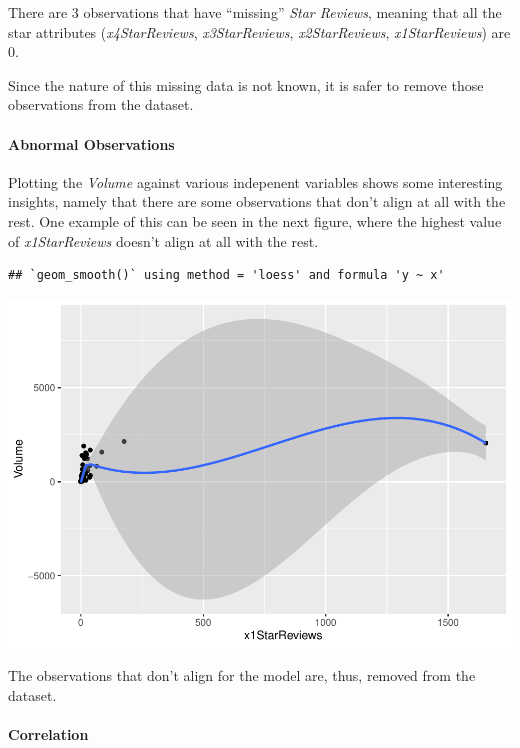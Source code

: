 \documentclass[]{article}
\let\oldparagraph\paragraph
\renewcommand{\paragraph}[1]{\oldparagraph{#1}\mbox{}}
\begin{document}
There are 3 observations that have ``missing'' \emph{Star Reviews},
meaning that all the star attributes (\emph{x4StarReviews},
\emph{x3StarReviews}, \emph{x2StarReviews}, \emph{x1StarReviews}) are 0.

Since the nature of this missing data is not known, it is safer to
remove those observations from the dataset.

\hypertarget{abnormal-observations}{%
\paragraph{Abnormal Observations}\label{abnormal-observations}}

Plotting the \emph{Volume} against various indepenent variables shows
some interesting insights, namely that there are some observations that
don't align at all with the rest. One example of this can be seen in the
next figure, where the highest value of \emph{x1StarReviews} doesn't
align at all with the rest.

\begin{verbatim}
## `geom_smooth()` using method = 'loess' and formula 'y ~ x'
\end{verbatim}

\includegraphics{final_predict_product_types_files/figure-latex/unnamed-chunk-2-1.pdf}

The observations that don't align for the model are, thus, removed from
the dataset.

\hypertarget{correlation}{%
\paragraph{Correlation}\label{correlation}}
\end{document}
